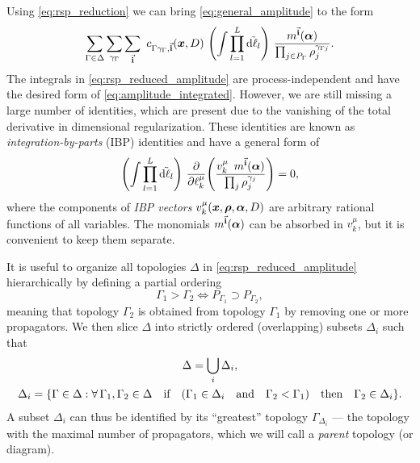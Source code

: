 Using \cref{eq:rsp_reduction} we can bring \cref{eq:general_amplitude} to the form 
\begin{equation} \label{eq:rsp_reduced_amplitude}
  \sum_{\Gamma \in \Delta} \sum_{\gamma_\Gamma} \sum_{\va{i}} ~ c_{\Gamma\gamma_\Gamma, \va{i}} (\vb*{x},D) ~ 
  \qty(\int \prod_{l=1}^{L} \tilde{\dd{\ell_l}}) ~  
  \frac{m^{\va{i}}(\vb*{\alpha})%
    }{\prod_{j\in P_\Gamma} \rho_j^{\gamma_{\Gamma j}}}.
\end{equation}
The integrals in \cref{eq:rsp_reduced_amplitude} are process-independent and have the desired form of \cref{eq:amplitude_integrated}.
However, we are still missing a large number of identities, which are present due to the vanishing of the total derivative in dimensional regularization.
These identities are known as \emph{integration-by-parts} (IBP) identities \cite{Chetyrkin:1981qh,Tkachov:1981wb} and have a general
form of
\begin{equation}
  \qty(\int \prod_{l=1}^{L} \tilde{\dd{\ell_l}}) ~  \pdv{\ell_k^\mu}(
  \frac{ v_k^\mu \ommit{(\vb*{x},\vb*{\rho},\vb*{\alpha},D)} ~ \, m^{\va{i}}(\vb*{\alpha})
    }{\prod_{j} \rho_j^{\gamma_{j}}}
    ) = 0,
  \label{eq:ibps}
\end{equation}
where the components of \emph{IBP vectors} $v_k^\mu(\vb*{x},\vb*{\rho},\vb*{\alpha},D)$ are arbitrary rational functions
of all variables. The monomials $m^{\va{i}}(\vb*{\alpha})$ can be absorbed in $v_k^\mu$, but
it is convenient to keep them separate.

It is useful to organize all topologies $\Delta$ in \cref{eq:rsp_reduced_amplitude}
hierarchically by defining a partial ordering
\begin{equation} \label{eq:topology_order}
    \Gamma_1 > \Gamma_2 \iff P_{\Gamma_1} \supset P_{\Gamma_2},
\end{equation}
meaning that topology $\Gamma_2$ is obtained from topology $\Gamma_1$ by removing one or more propagators.
We then slice $\Delta$ into strictly ordered (overlapping) subsets $\Delta_i$ such that
\begin{subequations} \label{eq:topology_sequence}
    \begin{gather}
         \Delta = \bigcup_i \Delta_i,  \\
         \Delta_i  = \{\Gamma \in \Delta : \forall \, \Gamma_1, \Gamma_2 \in\Delta \qif\qty( \Gamma_1 \in \Delta_i \qand \Gamma_2 < \Gamma_1) \qthen \Gamma_2 \in \Delta_i \}.
    \end{gather}
\end{subequations}
A subset $\Delta_i$ can thus be identified by its ``greatest'' topology $\Gamma_{\Delta_i}$ ---
the topology with the maximal number of propagators, which we will call a \emph{parent} topology (or diagram).

